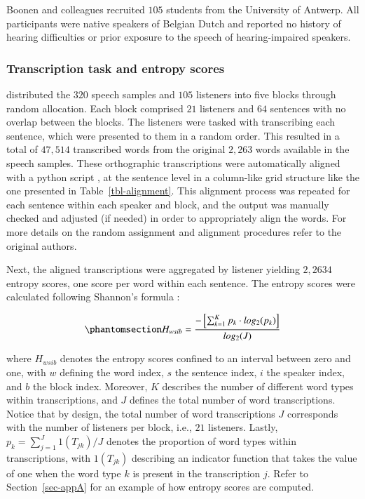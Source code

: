 \documentclass[
  authoryear,
  preprint,
  1p]{elsarticle}
\begin{document}
Boonen and colleagues recruited \(105\) students from the University of
Antwerp. All participants were native speakers of Belgian Dutch and
reported no history of hearing difficulties or prior exposure to the
speech of hearing-impaired speakers.

\subsubsection{Transcription task and entropy scores}\label{sec-M-TS}

{\citet{Boonen_et_al_2023} distributed the \(320\) speech samples and
\(105\) listeners into five blocks through random allocation. Each block
comprised \(21\) listeners and \(64\) sentences with no overlap between
the blocks. The listeners were tasked with transcribing each sentence,
which were presented to them in a random order. This resulted in a total
of \(47,514\) transcribed words from the original \(2,263\) words
available in the speech samples. These orthographic transcriptions were
automatically aligned with a python script \citep{Boonen_et_al_2023}, at
the sentence level in a column-like grid structure like the one
presented in Table~\ref{tbl-alignment}.} This alignment process was
repeated for each sentence within each speaker and block, and the output
was manually checked and adjusted (if needed) in order to appropriately
align the words. {For more details on the random assignment and
alignment procedures refer to the original authors.}

{Next, the aligned transcriptions were aggregated by listener yielding
\(2,2634\) entropy scores, one score per word within each sentence.} The
entropy scores were calculated following Shannon's formula
\citeyearpar{Shannon_1948}:

\begin{equation}\phantomsection\label{eq-entropy}{
H_{wsib} = \frac{ -\left[ \sum_{k=1}^{K}  p_{k} \cdot log_{2}(p_{k}) \right] }{ log_{2}(J)}
}\end{equation}

where \(H_{wsib}\) denotes the entropy scores confined to an interval
between zero and one, with \(w\) defining the word index, \(s\) the
sentence index, \(i\) the speaker index, and \(b\) the block index.
Moreover, \(K\) describes the number of different word types within
transcriptions, and \(J\) defines the total number of word
transcriptions. Notice that by design, the total number of word
transcriptions \(J\) corresponds with the number of listeners per block,
i.e., \(21\) listeners. Lastly, \(p_{k} = \sum_{j=1}^{J} 1(T_{jk}) / J\)
denotes the proportion of word types within transcriptions, with
\(1(T_{jk})\) describing an indicator function that takes the value of
one when the word type \(k\) is present in the transcription \(j\).
Refer to Section~\ref{sec-appA} for an example of how entropy scores are
computed.
\end{document}
